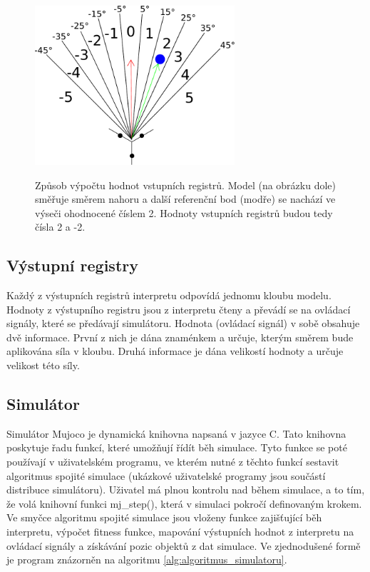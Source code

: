 \begin{figure}[h]
    \centering
    {\includegraphics[width=20em]{obrazky-figures/reference_direction_angles.pdf}}
    \caption{
    Způsob výpočtu hodnot vstupních registrů.
    Model (na obrázku dole) směřuje směrem nahoru a další referenční bod (modře) se nachází ve výseči ohodnocené číslem 2.
    Hodnoty vstupních registrů budou tedy čísla 2 a -2.
    }
    \label{fig:kruhove_vysece}
\end{figure}

\subsection{Výstupní registry}

Každý z výstupních registrů interpretu odpovídá jednomu kloubu modelu.
Hodnoty z výstupního registru jsou z interpretu čteny a převádí se na ovládací signály, které se předávají simulátoru.
Hodnota (ovládací signál) v sobě obsahuje dvě informace.
První z nich je dána znaménkem a určuje, kterým směrem bude aplikována síla v kloubu.
Druhá informace je dána velikostí hodnoty a určuje velikost této síly.


\subsection{Simulátor}
Simulátor Mujoco je dynamická knihovna napsaná v jazyce C.
Tato knihovna poskytuje řadu funkcí, které umožňují řídít běh simulace.
Tyto funkce se poté používají v uživatelském programu, ve kterém nutné z těchto funkcí sestavit algoritmus spojité simulace (ukázkové uživatelské programy jsou součástí distribuce simulátoru).
Uživatel má plnou kontrolu nad během simulace, a to tím, že volá knihovní funkci mj\_step(), která v simulaci pokročí definovaným krokem.
Ve smyčce algoritmu spojité simulace jsou vloženy funkce zajišťující běh interpretu, výpočet fitness funkce, mapování výstupních hodnot z interpretu na ovládací signály a získávání pozic objektů z dat simulace.
Ve zjednodušené formě je program znázorněn na algoritmu \ref{alg:algoritmus_simulatoru}.

